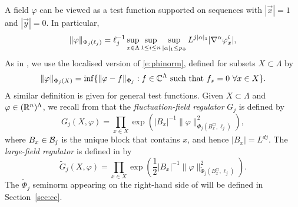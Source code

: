 A field $\varphi$ can be viewed as a test function supported on sequences with
$|\vec x| = 1$ and $|\vec y| = 0$.
In particular,
\begin{equation}
\lbeq{phinorm}
\|\varphi\|_{\Phi_j(\ell_j)}
	=
\ell_j^{-1}
\sup_{x\in \Lambda} \sup_{1\le i\le n}
\sup_{|\alpha|_1  \le p_\Phi}
L^{j|\alpha|_1}
|\nabla^{\alpha} \varphi^i_x|,
\end{equation}
As in \cite[(\ref{IE-e:PhiXdef})]{BS-rg-IE}, we use the localised version
of \eqref{e:phinorm}, defined for subsets $X \subset \Lambda$  by
\begin{equation}
\label{e:PhiXdef}
\|\varphi\|_{\Phi_j(X)}
	=
\inf
\{
	\|\varphi -f\|_{\Phi_j} :
	\text{$f \in \mathbb{C}^\Lambda$ such that $f_{x} = 0$
	$\forall x\in X$}
\}.
\end{equation}
A similar definition is given for general test functions.
Given $X \subset \Lambda$ and $\varphi \in ({\mathbb R}^n)^{\Lambda}$,
we recall from \cite[\eqref{IE-e:GPhidef}]{BS-rg-IE}
that the
\emph{fluctuation-field regulator} $G_j$
is defined by
\begin{equation}
\label{e:GPhidef}
G_j(X,\varphi)
	=
\prod_{x \in X} \exp
\left(|B_{x}|^{-1}\|\varphi\|_{\Phi_j (B_{x}^\Box,\ell_j )}^2 \right)
,
\end{equation}
where $B_{x}\in \mathcal{B}_j$ is the unique block that contains $x$,
and hence $|B_x| = L^{dj}$.
The \emph{large-field regulator} is defined in \cite[\eqref{IE-e:9Gdef}]{BS-rg-IE} by
\begin{equation}
\label{e:9Gdef}
\tilde G_j(X,\varphi)
	=
\prod_{x \in X}
\exp \left(
\frac 12 |B_{x}|^{-1}\|\varphi\|_{\tilde\Phi_j (B_{x}^\Box,\ell_j)}^2
\right)
.
\end{equation}
The $\tilde\Phi_j$ seminorm appearing on the right-hand side of  will be defined
in Section~\ref{sec:cc}.
